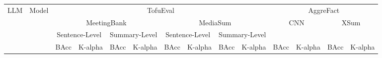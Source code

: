 \begin{table*}
\scriptsize
\centering
\begin{tabular}{@{}clcccccccccccc@{}}
\toprule
\multirow{4}{*}{LLM}  & \multirow{4}{*}{Model} & \multicolumn{8}{c}{TofuEval}                                                                                                                    & \multicolumn{4}{c}{AggreFact}                                                        \\ \cmidrule(l){3-13} 
                       & & \multicolumn{4}{c}{MeetingBank}                                        & \multicolumn{4}{c}{MediaSum}                                           & \multicolumn{2}{c}{\multirow{2}{*}{CNN}} & \multicolumn{2}{c}{\multirow{2}{*}{XSum}} \\
                       \cmidrule(l){3-6}\cmidrule(l){7-10}
                       & & \multicolumn{2}{c}{Sentence-Level} & \multicolumn{2}{c}{Summary-Level} & \multicolumn{2}{c}{Sentence-Level} & \multicolumn{2}{c}{Summary-Level} & \multicolumn{2}{c}{}                     & \multicolumn{2}{c}{}                      \\ \cmidrule(l){3-4}\cmidrule(l){5-6}\cmidrule(l){7-8}\cmidrule(l){9-10}\cmidrule(l){11-12}\cmidrule(l){13-14}
                       & & BAcc           & K-alpha           & BAcc           & K-alpha          & BAcc           & K-alpha           & BAcc           & K-alpha          & \multicolumn{1}{l}{BAcc}    & K-alpha    & BAcc               & K-alpha              
       

\\ \cmidrule(r){1-14}


\end{tabular}
\end{table*}
